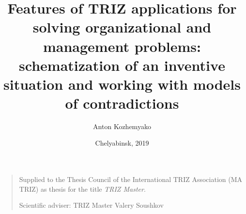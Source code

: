 \documentclass[11pt,a4paper]{article}
\title{Features of TRIZ applications for solving organizational and management
  problems: schematization of an inventive situation and working with models
  of contradictions}
\author{Anton Kozhemyako}
\date{Chelyabinsk, 2019}
\begin{document}
\maketitle

\begin{quote}
Supplied to the Thesis Council of the International TRIZ Association (MA TRIZ)
as thesis for the title \emph{TRIZ Master}.

Scientific adviser: TRIZ Master Valery Soushkov
\end{quote}
\newpage
\tableofcontents
\newpage



\end{document}
